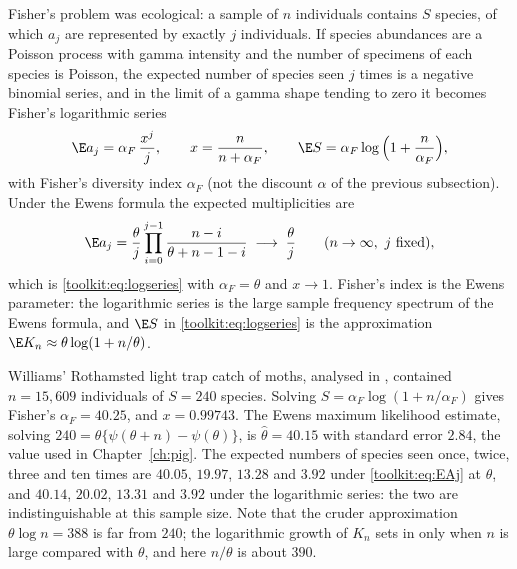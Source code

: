 Fisher's problem was ecological: a sample of $n$ individuals contains $S$ species, of which $a_j$
are represented by exactly $j$ individuals. If species abundances are a Poisson process with
gamma intensity and the number of specimens of each species is Poisson, the expected number of
species seen $j$ times is a negative binomial series, and in the limit of a gamma shape tending to
zero it becomes Fisher's logarithmic series \citep{toolkit:fisher1943}
\begin{equation}\label{toolkit:eq:logseries}
\E a_j=\alpha_F\,\frac{x^j}{j},\qquad x=\frac{n}{n+\alpha_F},\qquad
\E S=\alpha_F\log\Big(1+\frac{n}{\alpha_F}\Big),
\end{equation}
with Fisher's diversity index $\alpha_F$ (not the discount $\alpha$ of the previous subsection).
Under the Ewens formula the expected multiplicities are
\begin{equation}\label{toolkit:eq:EAj}
\E a_j=\frac{\theta}{j}\prod_{i=0}^{j-1}\frac{n-i}{\theta+n-1-i}\;\longrightarrow\;\frac{\theta}{j}
\qquad(n\to\infty,\ j\ \text{fixed}),
\end{equation}
which is \eqref{toolkit:eq:logseries} with $\alpha_F=\theta$ and $x\to1$. Fisher's index is the
Ewens parameter: the logarithmic series is the large sample frequency spectrum of the Ewens
formula, and $\E S$ in \eqref{toolkit:eq:logseries} is the approximation
$\E K_n\approx\theta\log(1+n/\theta)$.

\begin{example}\label{toolkit:ex:williams}
Williams' Rothamsted light trap catch of moths, analysed in \citet{toolkit:fisher1943}, contained
$n=15{,}609$ individuals of $S=240$ species. Solving $S=\alpha_F\log(1+n/\alpha_F)$ gives
Fisher's $\alpha_F=40.25$, and $x=0.99743$. The Ewens maximum likelihood estimate, solving
$240=\theta\{\psi(\theta+n)-\psi(\theta)\}$, is $\hat\theta=40.15$ with standard error $2.84$, the
value used in Chapter~\ref{ch:pig}. The expected numbers of species seen once, twice, three and
ten times are $40.05$, $19.97$, $13.28$ and $3.92$ under \eqref{toolkit:eq:EAj} at $\hat\theta$, and
$40.14$, $20.02$, $13.31$ and $3.92$ under the logarithmic series: the two are indistinguishable at
this sample size. Note that the cruder approximation $\theta\log n=388$ is far from $240$; the
logarithmic growth of $K_n$ sets in only when $n$ is large compared with $\theta$, and here
$n/\theta$ is about $390$.
\end{example}

